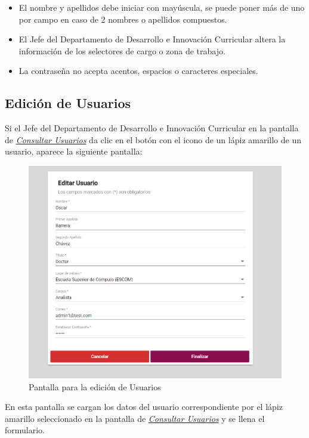\begin{itemize}
	\begin{itemize}
		\item El nombre y apellidos debe iniciar con mayúscula, se puede poner más de uno por campo en caso de 2 nombres o apellidos compuestos.
		\item El Jefe del Departamento de Desarrollo e Innovación Curricular altera la información de los selectores de cargo o zona de trabajo.
		\item La contraseña no acepta acentos, espacios o caracteres especiales.
	\end{itemize}
	
\end{itemize}

\newpage

\hypertarget{editar-user}{}
\subsection{Edición de Usuarios}
Si el Jefe del Departamento de Desarrollo e Innovación Curricular en la pantalla de \hyperlink{consultarUs}{\textit{Consultar Usuarios}} da clic en el botón con el icono de un lápiz amarillo de un usuario, aparece la siguiente pantalla:

\begin{figure}[H]
	\centering
	\hypertarget{editarUs}{\includegraphics[width=0.6\linewidth]{images/SP5/Editar-Usuario}}
	\caption{Pantalla para la edición de Usuarios}
	\label{editarrh}
\end{figure}

En esta pantalla se cargan los datos del usuario correspondiente por el lápiz amarillo seleccionado en la pantalla de \hyperlink{consultarUs}{\textit{Consultar Usuarios}} y se llena el formulario.

